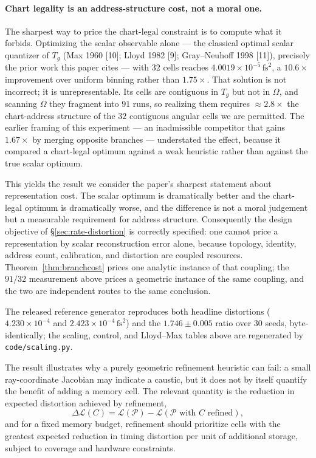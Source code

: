\documentclass[11pt]{article}
\begin{document}
\paragraph{Chart legality is an address-structure cost, not a moral one.}
The sharpest way to price the chart-legal constraint is to compute what it forbids.
Optimizing the scalar observable alone --- the classical optimal scalar quantizer of
$T_g$ (Max 1960 [10]; Lloyd 1982 [9]; Gray--Neuhoff 1998 [11]), precisely the prior work
this paper cites --- with $32$ cells reaches $4.0019\times10^{-5}\,\mathrm{fs}^2$, a
$10.6\times$ improvement over uniform binning rather than $1.75\times$. That solution is
not incorrect; it is unrepresentable. Its cells are contiguous in $T_g$ but not in
$\Omega$, and scanning $\Omega$ they fragment into $91$ runs, so realizing them requires
$\approx2.8\times$ the chart-address structure of the $32$ contiguous angular cells we are
permitted. The earlier framing of this experiment --- an inadmissible competitor that
gains $1.67\times$ by merging opposite branches --- understated the effect, because it
compared a chart-legal optimum against a weak heuristic rather than against the true
scalar optimum.

This yields the result we consider the paper's sharpest statement about representation
cost. The scalar optimum is dramatically better and the chart-legal optimum is
dramatically worse, and the difference is not a moral judgement but a measurable
requirement for address structure. Consequently the design objective of
\S\ref{sec:rate-distortion} is correctly specified: one cannot price a representation by
scalar reconstruction error alone, because topology, identity, address count,
calibration, and distortion are coupled resources. Theorem~\ref{thm:branchcost} prices
one analytic instance of that coupling; the $91/32$ measurement above prices a geometric
instance of the same coupling, and the two are independent routes to the same conclusion.

The released reference generator reproduces both headline distortions
($4.230\times10^{-4}$ and $2.423\times10^{-4}\,\mathrm{fs}^2$) and the $1.746\pm0.005$
ratio over 30 seeds, byte-identically; the scaling, control, and Lloyd--Max tables above
are regenerated by \texttt{code/scaling.py}.

The result illustrates why a purely geometric refinement heuristic can fail: a small
ray-coordinate Jacobian may indicate a caustic, but it does not by itself quantify the
benefit of adding a memory cell. The relevant quantity is the reduction in expected
distortion achieved by refinement,
\begin{equation}
\boxed{\Delta\mathcal{L}(C) = \mathcal{L}(\mathcal{P}) - \mathcal{L}(\mathcal{P} \text{ with } C \text{ refined}),}
\end{equation}
and for a fixed memory budget, refinement should prioritize cells with the greatest
expected reduction in timing distortion per unit of additional storage, subject to
coverage and hardware constraints.
\end{document}
